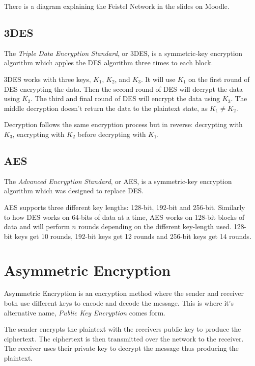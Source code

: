 \begin{extlink}
There is a diagram explaining the Feistel Network in the slides on Moodle.
\end{extlink}


\subsection{3DES}
The \textit{Triple Data Encryption Standard}, or 3DES, is a symmetric-key encryption algorithm which apples the DES algorithm three times to each block. 

3DES works with three keys, $K_1$, $K_2$, and $K_3$. It will use $K_1$ on the first round of DES encrypting the data. Then the second round of DES will decrypt the data using $K_2$. The third and final round of DES will encrypt the data using $K_3$. The middle decryption doesn't return the data to the plaintext state, as $K_1 \neq K_2$. 

Decryption follows the same encryption process but in reverse: decrypting with $K_3$, encrypting with $K_2$ before decrypting with $K_1$. 

\subsection{AES}
The \textit{Advanced Encryption Standard}, or AES, is a symmetric-key encryption algorithm which was designed to replace DES.

AES supports three different key lengths: 128-bit, 192-bit and 256-bit. Similarly to how DES works on 64-bits of data at a time, AES works on 128-bit blocks of data and will perform $n$ rounds depending on the different key-length used. 128-bit keys get 10 rounds, 192-bit keys get 12 rounds and 256-bit keys get 14 rounds. 

\section{Asymmetric Encryption}
Asymmetric Encryption is an encryption method where the sender and receiver both use different keys to encode and decode the message. This is where it's alternative name, \textit{Public Key Encryption} comes form.

The sender encrypts the plaintext with the receivers public key to produce the ciphertext. The ciphertext is then transmitted over the network to the receiver. The receiver uses their private key to decrypt the message thus producing the plaintext. 

